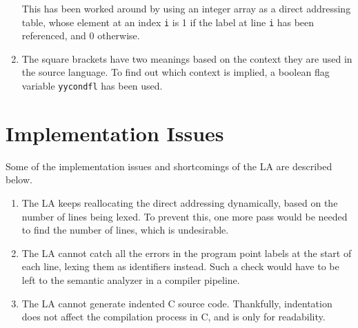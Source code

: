 \documentclass[journal,12pt,twocolumn]{IEEEtran}
\begin{document}
\begin{enumerate}
    This has been worked around by using an integer array as a direct addressing
    table, whose element at an index \texttt{i} is 1 if the label at line
    \texttt{i} has been referenced, and 0 otherwise.
    \item The square brackets have two meanings based on the context they are
    used in the source language. To find out which context is implied, a boolean
    flag variable \texttt{yycondfl} has been used.
\end{enumerate}

\section{Implementation Issues}
Some of the implementation issues and shortcomings of the LA are described
below.
\begin{enumerate}
    \item The LA keeps reallocating the direct addressing dynamically, based on
    the number of lines being lexed. To prevent this, one more pass would be
    needed to find the number of lines, which is undesirable.
    \item The LA cannot catch all the errors in the program point labels at the
    start of each line, lexing them as identifiers instead. Such a check would
    have to be left to the semantic analyzer in a compiler pipeline.
    \item The LA cannot generate indented C source code. Thankfully, indentation
    does not affect the compilation process in C, and is only for readability. 
\end{enumerate}
\end{document}
